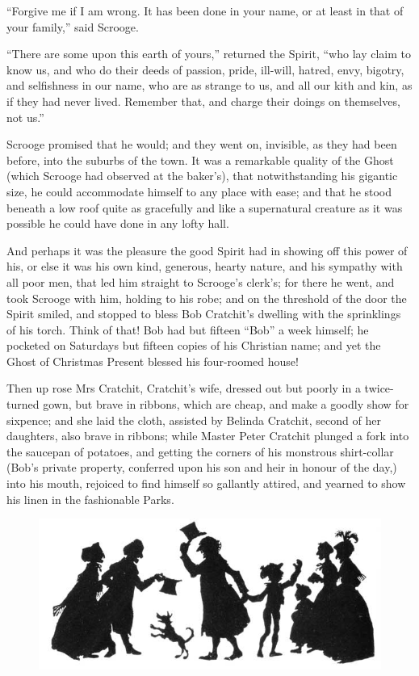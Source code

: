 \documentclass[paper=5.5in:8.5in,BCOR=5mm,twoside,DIV=calc,12pt,usegeometry]{scrbook} %
\begin{document}
\enquote{Forgive me if I am wrong. It has been done in your name, or at least in that of your family,} said Scrooge.

\enquote{There are some upon this earth of yours,} returned the Spirit, \enquote{who lay claim to know us, and who do their deeds of passion, pride, ill-will, hatred, envy, bigotry, and selfishness in our name, who are as strange to us, and all our kith and kin, as if they had never lived. Remember that, and charge their doings on themselves, not us.}


Scrooge promised that he would; and they went on, invisible, as they had been before, into the suburbs of the town. It was a remarkable quality of the Ghost (which Scrooge had observed at the baker's), that notwithstanding his gigantic size, he could accommodate himself to any place with ease; and that he stood beneath a low roof quite as gracefully and like a supernatural creature as it was possible he could have done in any lofty hall.



And perhaps it was the pleasure the good Spirit had in showing off this power of his, or else it was his own kind, generous, hearty nature, and his sympathy with all poor men, that led him straight to Scrooge's clerk's; for there he went, and took Scrooge with him, holding to his robe; and on the threshold of the door the Spirit smiled, and stopped to bless Bob Cratchit's dwelling with the sprinklings of his torch. Think of that! Bob had but fifteen \enquote{Bob} a week himself; he pocketed on Saturdays but fifteen copies of his Christian name; and yet the Ghost of Christmas Present blessed his four-roomed house!



Then up rose Mrs Cratchit, Cratchit's wife, dressed out but poorly in a twice-turned gown, but brave in ribbons, which are cheap, and make a goodly show for sixpence; and she laid the cloth, assisted by Belinda Cratchit, second of her daughters, also brave in ribbons; while Master Peter Cratchit plunged a fork into the saucepan of potatoes, and getting the corners of his monstrous shirt-collar (Bob's private property, conferred upon his son and heir in honour of the day,) into his mouth, rejoiced to find himself so gallantly attired, and yearned to show his linen in the fashionable Parks. 

\cleardoubleevenemptypage
\begin{figure}[t]
\centering
\includegraphics[width=\linewidth]{gs109}
\end{figure}
\end{document}
